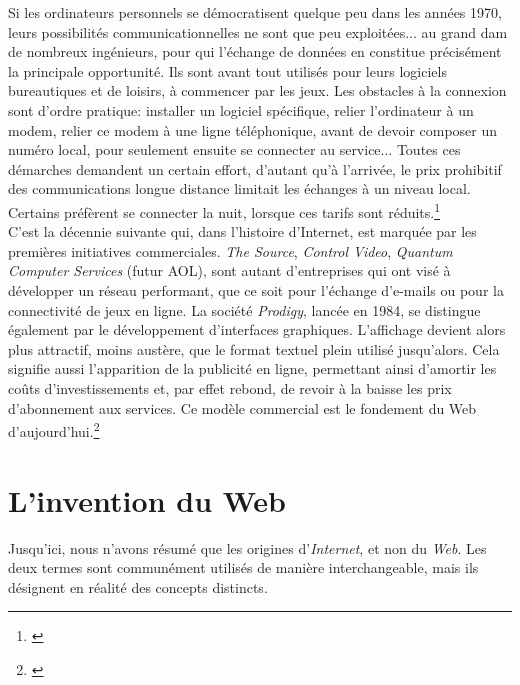 \documentclass[a4paper,12pt,twoside]{book}
\begin{document}
Si les ordinateurs personnels se démocratisent quelque peu dans les années 1970, leurs possibilités communicationnelles ne sont que peu exploitées... au grand dam de nombreux ingénieurs, pour qui l'échange de données en constitue précisément la principale opportunité. Ils sont avant tout utilisés pour leurs logiciels bureautiques et de loisirs, à commencer par les jeux. Les obstacles à la connexion sont d'ordre pratique: installer un logiciel spécifique, relier l'ordinateur à un modem, relier ce modem à une ligne téléphonique, avant de devoir composer un numéro local, pour seulement ensuite se connecter au service... Toutes ces démarches demandent un certain effort, d'autant qu'à l'arrivée, le prix prohibitif des communications longue distance limitait les échanges à un niveau local. Certains préfèrent se connecter la nuit, lorsque ces tarifs sont réduits.\footnote{\cite[p.~17-18]{ceruzziAuxOriginesAmericaines2012}}\\

C'est la décennie suivante qui, dans l'histoire d'Internet, est marquée par les premières initiatives commerciales. \textit{The Source}, \textit{Control Video}, \textit{Quantum Computer Services} (futur AOL), sont autant d'entreprises qui ont visé à développer un réseau performant, que ce soit pour l'échange d'e-mails ou pour la connectivité de jeux en ligne. La société \textit{Prodigy}, lancée en 1984, se distingue également par le développement d'interfaces graphiques. L'affichage devient alors plus attractif, moins austère, que le format textuel plein utilisé jusqu'alors. Cela signifie aussi l'apparition de la publicité en ligne, permettant ainsi d'amortir les coûts d'investissements et, par effet rebond, de revoir à la baisse les prix d'abonnement aux services. Ce modèle commercial est le fondement du Web d'aujourd'hui.\footnote{\cite[p.~18-19]{ceruzziAuxOriginesAmericaines2012}}\\

\section{L'invention du Web}
Jusqu'ici, nous n'avons résumé que les origines d'\textit{Internet}, et non du \textit{Web}. Les deux termes sont communément utilisés de manière interchangeable, mais ils désignent en réalité des concepts distincts.\\
\end{document}
